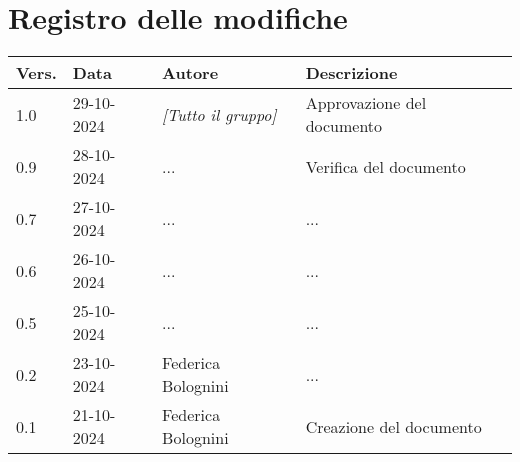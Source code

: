 \section*{Registro delle modifiche}

\begin{table}[h]
    \centering
    \begin{tabular}{|l|l|l|l|}
        \hline
        \rowcolor[gray]{0.9}
        \textbf{Vers.} & \textbf{Data} & \textbf{Autore} & \textbf{Descrizione}\\
        \hline
        1.0 & 29-10-2024 & \emph{[Tutto il gruppo]} & Approvazione del documento\\
        \hline
        0.9 & 28-10-2024 & ... & Verifica del documento\\
        \hline
        0.7 & 27-10-2024 & ... & ...\\
        \hline
        0.6 & 26-10-2024 & ... & ...\\
        \hline
        0.5 & 25-10-2024 & ... & ...\\
        \hline
        0.2 & 23-10-2024 & Federica Bolognini & ...\\
        \hline
        0.1 & 21-10-2024 & Federica Bolognini & Creazione del documento\\
        \hline
    \end{tabular}
\end{table}
